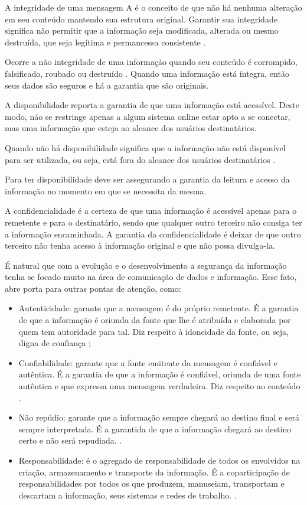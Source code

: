 A integridade de uma mensagem A é o conceito de que não há nenhuma alteração em seu conteúdo mantendo sua estrutura original. Garantir sua integridade significa não permitir que a informação seja modificada, alterada ou mesmo destruída, que seja legítima e permancessa consistente \cite{Dantas2011}.

Ocorre a não integridade de uma informação quando seu conteúdo é corrompido, falsificado, roubado ou destruído \cite{Dantas2011}. Quando uma informação está íntegra, então seus dados são seguros e há a garantia que são originais.

A disponibilidade reporta a garantia de que uma informação está acessível. Deste modo, não se restringe apenas a algum sistema online estar apto a se conectar, mas uma informação que esteja ao alcance dos usuários destinatários.

Quando não há disponibilidade significa que a informação não está disponível para ser utilizada, ou seja, está fora do alcance dos usuários destinatários \cite{Dantas2011}. 

Para ter disponibilidade deve ser assegurando a garantia da leitura e acesso da informação no momento em que se necessita da mesma.

A confidencialidade é a certeza de que uma informação é acessível apenas para o remetente e para o destinatário, sendo que qualquer outro terceiro não consiga ter a informação encaminhada. A garantia da confidencialidade é deixar de que outro terceiro não tenha acesso à informação original e que não possa divulga-la. 

É natural que com a evolução e o desenvolvimento a segurança da informação tenha se focado muito na área de comunicação de dados e informação. Esse fato, abre porta para outras pontas de atenção, como:

\begin{itemize}
\item Autenticidade: garante que a mensagem é do próprio remetente. É a garantia de que a informação é oriunda da fonte que lhe é atribuída e elaborada por quem tem autoridade para tal. Diz respeito à idoneidade da fonte, ou seja, digna de confiança \cite{Dantas2011};
\item Confiabilidade: garante que a fonte emitente da mensagem é confiável e autêntica. É a garantia de que a informação é confiável, oriunda de uma fonte autêntica e que expressa uma mensagem verdadeira. Diz respeito ao conteúdo \cite{Dantas2011}.
\item Não repúdio: garante que a informação sempre chegará ao destino final e será sempre interpretada. É a garantida de que a informação chegará ao destino certo e não será repudiada. \cite{Dantas2011}.
\item Responsabilidade: é o agregado de responsabilidade de todos os envolvidos na criação, armazenamento e transporte da informação. É a coparticipação de responsabilidades por todos os que produzem, manuseiam, transportam e descartam a informação, seus sistemas e redes de trabalho. \cite{Dantas2011}.
\end{itemize}


